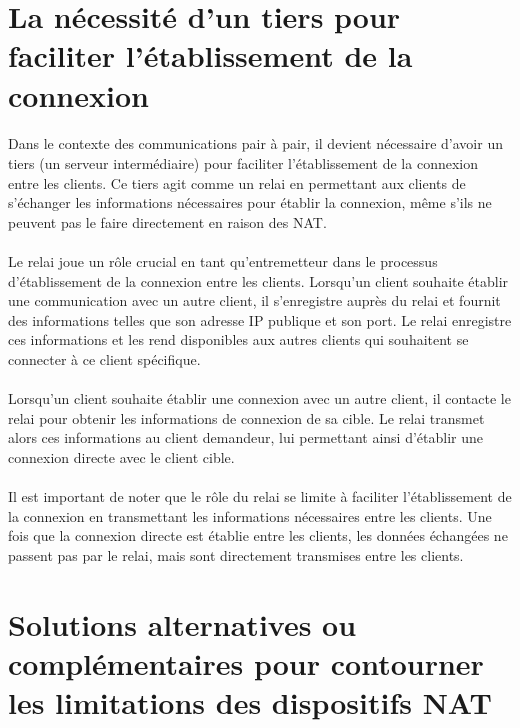 \section{La nécessité d'un tiers pour faciliter l'établissement de la connexion}

\paragraph{}
Dans le contexte des communications pair à pair, il devient nécessaire d'avoir un tiers (un serveur intermédiaire) pour faciliter l'établissement de la connexion entre les clients.
Ce tiers agit comme un relai en permettant aux clients de s'échanger les informations nécessaires pour établir la connexion, même s'ils ne peuvent pas le faire directement en raison des NAT.

\paragraph{}
Le relai joue un rôle crucial en tant qu'entremetteur dans le processus d'établissement de la connexion entre les clients. Lorsqu'un client souhaite établir une communication avec un autre client,
il s'enregistre auprès du relai et fournit des informations telles que son adresse IP publique et son port. Le relai enregistre ces informations et les rend disponibles aux autres clients qui souhaitent
se connecter à ce client spécifique.

\paragraph{}
Lorsqu'un client souhaite établir une connexion avec un autre client, il contacte le relai pour obtenir les informations de connexion de sa cible. Le relai transmet alors ces informations au client
demandeur, lui permettant ainsi d'établir une connexion directe avec le client cible.

\paragraph{}
Il est important de noter que le rôle du relai se limite à faciliter l'établissement de la connexion en transmettant les informations nécessaires entre les clients. Une fois que la connexion directe
est établie entre les clients, les données échangées ne passent pas par le relai, mais sont directement transmises entre les clients.

\section{Solutions alternatives ou complémentaires pour contourner les limitations des dispositifs NAT}

